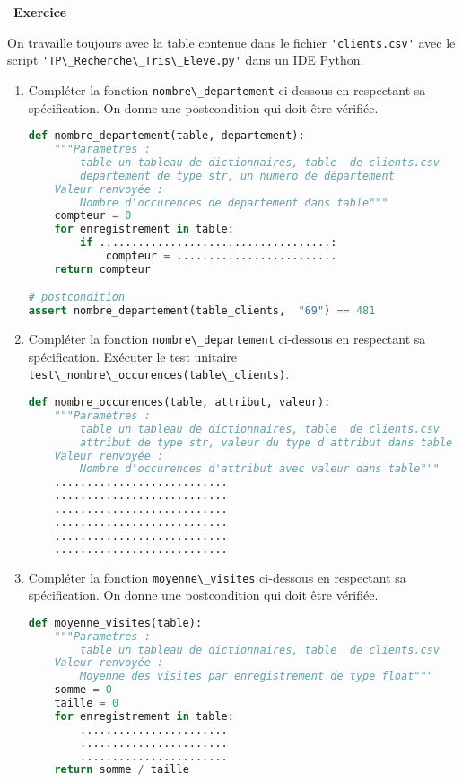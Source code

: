 \documentclass[
  11pt,
]{article}
\newcommand{\passthrough}[1]{#1}
\newcounter{exo}
\newenvironment{exercice}[1]
{\par \medskip   \addtocounter{exo}{1} \noindent  
\begin{bclogo}[arrondi =0.1,   noborder = true, logo=\bccrayon, marge=4]{~\textbf{Exercice} \textbf{\theexo} {\itshape #1} }  \par}
{
\end{bclogo}
 \par \bigskip }
\newcounter{def}
\begin{document}
\begin{exercice}{}

On travaille toujours avec la table contenue dans le fichier
\passthrough{\lstinline!'clients.csv'!} avec le script
\passthrough{\lstinline!'TP\_Recherche\_Tris\_Eleve.py'!} dans un IDE
Python.

\begin{enumerate}
\def\labelenumi{\arabic{enumi}.}
\item
  Compléter la fonction \passthrough{\lstinline!nombre\_departement!}
  ci-dessous en respectant sa spécification. On donne une postcondition
  qui doit être vérifiée.

\begin{lstlisting}[language=Python]
def nombre_departement(table, departement):
    """Paramètres : 
        table un tableau de dictionnaires, table  de clients.csv
        departement de type str, un numéro de département
    Valeur renvoyée :
        Nombre d'occurences de departement dans table"""
    compteur = 0
    for enregistrement in table:
        if ....................................:
            compteur = .........................
    return compteur

# postcondition
assert nombre_departement(table_clients,  "69") == 481
\end{lstlisting}
\item
  Compléter la fonction \passthrough{\lstinline!nombre\_departement!}
  ci-dessous en respectant sa spécification. Exécuter le test unitaire
  \passthrough{\lstinline!test\_nombre\_occurences(table\_clients)!}.

\begin{lstlisting}[language=Python]
def nombre_occurences(table, attribut, valeur):
    """Paramètres : 
        table un tableau de dictionnaires, table  de clients.csv
        attribut de type str, valeur du type d'attribut dans table
    Valeur renvoyée :
        Nombre d'occurences d'attribut avec valeur dans table"""
    ...........................
    ...........................
    ...........................
    ...........................
    ...........................
    ...........................
\end{lstlisting}
\item
  Compléter la fonction \passthrough{\lstinline!moyenne\_visites!}
  ci-dessous en respectant sa spécification. On donne une postcondition
  qui doit être vérifiée.

\begin{lstlisting}[language=Python]
def moyenne_visites(table):
    """Paramètres : 
        table un tableau de dictionnaires, table  de clients.csv
    Valeur renvoyée :
        Moyenne des visites par enregistrement de type float"""
    somme = 0
    taille = 0
    for enregistrement in table:
        .......................
        .......................
        .......................
    return somme / taille


\end{lstlisting}
\end{enumerate}
\end{exercice}
\end{document}
